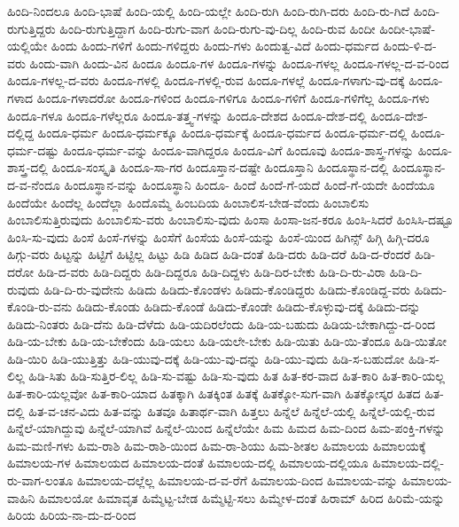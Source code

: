 {ಹಿಂದಿ-ನಿಂದಲೂ
ಹಿಂದಿ-ಭಾಷೆ
ಹಿಂದಿ-ಯಲ್ಲಿ
ಹಿಂದಿ-ಯಲ್ಲೇ
ಹಿಂದಿ-ರುಗಿ
ಹಿಂದಿ-ರುಗಿ-ದರು
ಹಿಂದಿ-ರು-ಗಿದೆ
ಹಿಂದಿ-ರುಗುತ್ತಿದ್ದರು
ಹಿಂದಿ-ರುಗುತ್ತಿದ್ದಾಗ
ಹಿಂದಿ-ರುಗು-ವಾಗ
ಹಿಂದಿ-ರುಗು-ವು-ದಿಲ್ಲ
ಹಿಂದಿ-ರುವ
ಹಿಂದೀ
ಹಿಂದೀ-ಭಾಷೆ-ಯಲ್ಲಿಯೇ
ಹಿಂದು
ಹಿಂದು-ಗಳಿಗೆ
ಹಿಂದು-ಗಳಿದ್ದರು
ಹಿಂದು-ಗಳು
ಹಿಂದುತ್ವ-ವಿದೆ
ಹಿಂದು-ಧರ್ಮದ
ಹಿಂದು-ಳಿ-ದ-ವರು
ಹಿಂದು-ವಾಗಿ
ಹಿಂದು-ವಿನ
ಹಿಂದೂ
ಹಿಂದೂ-ಗಳ
ಹಿಂದೂ-ಗಳನ್ನು
ಹಿಂದೂ-ಗಳಲ್ಲ
ಹಿಂದೂ-ಗಳಲ್ಲ-ದ-ವ-ರಿಂದ
ಹಿಂದೂ-ಗಳಲ್ಲ-ದ-ವರು
ಹಿಂದೂ-ಗಳಲ್ಲಿ
ಹಿಂದೂ-ಗಳಲ್ಲಿ-ರುವ
ಹಿಂದೂ-ಗಳಲ್ಲೆ
ಹಿಂದೂ-ಗಳಾಗು-ವು-ದಕ್ಕೆ
ಹಿಂದೂ-ಗಳಾದ
ಹಿಂದೂ-ಗಳಾದರೋ
ಹಿಂದೂ-ಗಳಿಂದ
ಹಿಂದೂ-ಗಳಿಗೂ
ಹಿಂದೂ-ಗಳಿಗೆ
ಹಿಂದೂ-ಗಳಿಗೆಲ್ಲ
ಹಿಂದೂ-ಗಳು
ಹಿಂದೂ-ಗಳೂ
ಹಿಂದೂ-ಗಳೆಲ್ಲರೂ
ಹಿಂದೂ-ತತ್ತ್ವ-ಗಳನ್ನು
ಹಿಂದೂ-ದೇಶದ
ಹಿಂದೂ-ದೇಶ-ದಲ್ಲಿ
ಹಿಂದೂ-ದೇಶ-ದಲ್ಲಿದ್ದ
ಹಿಂದೂ-ಧರ್ಮ
ಹಿಂದೂ-ಧರ್ಮಕ್ಕೂ
ಹಿಂದೂ-ಧರ್ಮಕ್ಕೆ
ಹಿಂದೂ-ಧರ್ಮದ
ಹಿಂದೂ-ಧರ್ಮ-ದಲ್ಲಿ
ಹಿಂದೂ-ಧರ್ಮ-ದಷ್ಟು
ಹಿಂದೂ-ಧರ್ಮ-ವನ್ನು
ಹಿಂದೂ-ವಾಗಿದ್ದರೂ
ಹಿಂದೂ-ವಿಗೆ
ಹಿಂದೂವು
ಹಿಂದೂ-ಶಾಸ್ತ್ರ-ಗಳನ್ನು
ಹಿಂದೂ-ಶಾಸ್ತ್ರ-ದಲ್ಲಿ
ಹಿಂದೂ-ಸಂಸ್ಕೃತಿ
ಹಿಂದೂ-ಸಾ-ಗರ
ಹಿಂದೂಸ್ತಾನ-ದಷ್ಟೇ
ಹಿಂದೂಸ್ತಾನಿ
ಹಿಂದೂಸ್ಥಾನ-ದಲ್ಲಿ
ಹಿಂದೂಸ್ಥಾನ-ದ-ವ-ನೆಂದೂ
ಹಿಂದೂಸ್ಥಾನ-ವನ್ನು
ಹಿಂದೂಸ್ಥಾನಿ
ಹಿಂದೂ-
ಹಿಂದೆ
ಹಿಂದೆ-ಗೆ-ಯದೆ
ಹಿಂದೆ-ಗೆ-ಯದೇ
ಹಿಂದೆಯೂ
ಹಿಂದೆಯೇ
ಹಿಂದೆಲ್ಲ
ಹಿಂದೆಲ್ಲಾ
ಹಿಂದೊಮ್ಮೆ
ಹಿಂಬದಿಯ
ಹಿಂಬಾಲಿಸ-ಬೇಡ-ವೆಂದು
ಹಿಂಬಾಲಿಸು
ಹಿಂಬಾಲಿಸುತ್ತಿರುವುದು
ಹಿಂಬಾಲಿಸು-ವರು
ಹಿಂಬಾಲಿಸು-ವುದು
ಹಿಂಸಾ
ಹಿಂಸಾ-ಜನ-ಕರೂ
ಹಿಂಸಿ-ಸಿದರೆ
ಹಿಂಸಿಸಿ-ದಷ್ಟೂ
ಹಿಂಸಿ-ಸು-ವುದು
ಹಿಂಸೆ
ಹಿಂಸೆ-ಗಳನ್ನು
ಹಿಂಸೆಗೆ
ಹಿಂಸೆಯ
ಹಿಂಸೆ-ಯನ್ನು
ಹಿಂಸೆ-ಯಿಂದ
ಹಿಗಿನ್ಸ್
ಹಿಗ್ಗಿ
ಹಿಗ್ಗಿ-ದರೂ
ಹಿಗ್ಗು-ವರು
ಹಿಟ್ಟನ್ನು
ಹಿಟ್ಟಿಗೆ
ಹಿಟ್ಟಿಲ್ಲ
ಹಿಟ್ಟು
ಹಿಡಿ
ಹಿಡಿದ
ಹಿಡಿ-ದಂತೆ
ಹಿಡಿ-ದರು
ಹಿಡಿ-ದರೆ
ಹಿಡಿ-ದ-ರೆಂದರೆ
ಹಿಡಿ-ದರೋ
ಹಿಡಿ-ದ-ವರು
ಹಿಡಿ-ದಿದ್ದರು
ಹಿಡಿ-ದಿದ್ದರೂ
ಹಿಡಿ-ದಿದ್ದಳು
ಹಿಡಿ-ದಿರ-ಬೇಕು
ಹಿಡಿ-ದಿ-ರು-ವಿರಾ
ಹಿಡಿ-ದಿ-ರುವುದು
ಹಿಡಿ-ದಿ-ರು-ವುದೇನು
ಹಿಡಿದು
ಹಿಡಿದು-ಕೊಂಡಳು
ಹಿಡಿದು-ಕೊಂಡಿದ್ದರು
ಹಿಡಿದು-ಕೊಂಡಿದ್ದ-ವರು
ಹಿಡಿದು-ಕೊಂಡಿ-ರು-ವನು
ಹಿಡಿದು-ಕೊಂಡು
ಹಿಡಿದು-ಕೊಂಡೆ
ಹಿಡಿದು-ಕೊಂಡೇ
ಹಿಡಿದು-ಕೊಳ್ಳುವು-ದಕ್ಕೆ
ಹಿಡಿದು-ದನ್ನು
ಹಿಡಿದು-ನಿಂತರು
ಹಿಡಿ-ದೆನು
ಹಿಡಿ-ದೆಳೆದು
ಹಿಡಿ-ಯದಿರಲೆಂದು
ಹಿಡಿ-ಯ-ಬಹುದು
ಹಿಡಿಯ-ಬೇಕಾಗಿದ್ದು-ದ-ರಿಂದ
ಹಿಡಿ-ಯ-ಬೇಕು
ಹಿಡಿ-ಯ-ಬೇಕೆಂದು
ಹಿಡಿ-ಯಲು
ಹಿಡಿ-ಯಲೇ-ಬೇಕು
ಹಿಡಿ-ಯಿತು
ಹಿಡಿ-ಯಿ-ತೆಂದೂ
ಹಿಡಿ-ಯಿತೋ
ಹಿಡಿ-ಯಿರಿ
ಹಿಡಿ-ಯುತ್ತಿತ್ತು
ಹಿಡಿ-ಯುವು-ದಕ್ಕೆ
ಹಿಡಿ-ಯು-ವು-ದನ್ನು
ಹಿಡಿ-ಯು-ವುದು
ಹಿಡಿ-ಸ-ಬಹುದೋ
ಹಿಡಿ-ಸ-ಲಿಲ್ಲ
ಹಿಡಿ-ಸಿತು
ಹಿಡಿ-ಸುತ್ತಿರ-ಲಿಲ್ಲ
ಹಿಡಿ-ಸು-ವಷ್ಟು
ಹಿಡಿ-ಸು-ವುದು
ಹಿತ
ಹಿತ-ಕರ-ವಾದ
ಹಿತ-ಕಾರಿ
ಹಿತ-ಕಾರಿ-ಯಲ್ಲ
ಹಿತ-ಕಾರಿ-ಯಲ್ಲವೋ
ಹಿತ-ಕಾರಿ-ಯಾದ
ಹಿತಕ್ಕಾಗಿ
ಹಿತಕ್ಕಿಂತ
ಹಿತಕ್ಕೆ
ಹಿತಕ್ಕೋ-ಸುಗ-ವಾಗಿ
ಹಿತಕ್ಕೋಸ್ಕರ
ಹಿತದ
ಹಿತ-ದಲ್ಲಿ
ಹಿತ-ವ-ಚನ-ವಿದು
ಹಿತ-ವನ್ನು
ಹಿತವೂ
ಹಿತಾರ್ಥ-ವಾಗಿ
ಹಿತ್ತಲು
ಹಿನ್ನೆಲೆ
ಹಿನ್ನೆಲೆ-ಯಲ್ಲಿ
ಹಿನ್ನೆಲೆ-ಯಲ್ಲಿ-ರುವ
ಹಿನ್ನೆಲೆ-ಯಾಗಿದ್ದುವು
ಹಿನ್ನೆಲೆ-ಯಾಗಿವೆ
ಹಿನ್ನೆಲೆ-ಯಿಂದ
ಹಿನ್ನೆಲೆಯೇ
ಹಿಮ
ಹಿಮದ
ಹಿಮ-ದಿಂದ
ಹಿಮ-ಪಂಕ್ತಿ-ಗಳನ್ನು
ಹಿಮ-ಮಣಿ-ಗಳು
ಹಿಮ-ರಾಶಿ
ಹಿಮ-ರಾಶಿ-ಯಿಂದ
ಹಿಮ-ರಾ-ಶಿಯು
ಹಿಮ-ಶೀತಲ
ಹಿಮಾಲಯ
ಹಿಮಾಲಯಕ್ಕೆ
ಹಿಮಾಲಯ-ಗಳ
ಹಿಮಾಲಯದ
ಹಿಮಾಲಯ-ದಂತೆ
ಹಿಮಾಲಯ-ದಲ್ಲಿ
ಹಿಮಾಲಯ-ದಲ್ಲಿಯೂ
ಹಿಮಾಲಯ-ದಲ್ಲಿ-ರು-ವಾಗ-ಲಂತೂ
ಹಿಮಾಲಯ-ದಲ್ಲೆಲ್ಲ
ಹಿಮಾಲಯ-ದ-ವ-ರೆಗೆ
ಹಿಮಾಲಯ-ದಿಂದ
ಹಿಮಾಲಯ-ವನ್ನು
ಹಿಮಾಲಯ-ವಾಹಿನಿ
ಹಿಮಾಲಯೋ
ಹಿಮಾವೃತ
ಹಿಮ್ಮೆಟ್ಟ-ಬೇಡ
ಹಿಮ್ಮೆಟ್ಟಿ-ಸಲು
ಹಿಮ್ಮೇಳ-ದಂತೆ
ಹಿರಾಮ್
ಹಿರಿದ
ಹಿರಿಮೆ-ಯನ್ನು
ಹಿರಿಯ
ಹಿರಿಯ-ನಾ-ದು-ದ-ರಿಂದ
}
